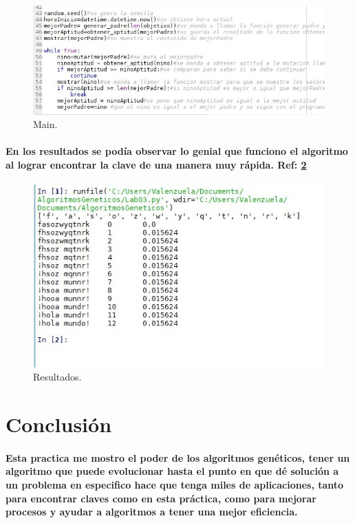 \documentclass[10pt,a4paper]{article}
\begin{document}
\begin{figure}[H]
\includegraphics[scale=0.7] {img5.jpg}
\caption{Main.}
\label{fig:cod5}
\end{figure}

\paragraph{
En los resultados se pod\'ia observar lo genial que funciono el algoritmo al lograr encontrar la clave de una manera muy r\'apida. Ref: \ref{fig:cod6}}

\begin{figure}[H]
\includegraphics[scale=0.7] {img6.jpg}
\caption{Resultados.}
\label{fig:cod6}
\end{figure}



\section{Conclusi\'on}
\paragraph{Esta practica me mostro el poder de los algoritmos gen\'eticos, tener un algoritmo que puede evolucionar hasta el punto en que d\'e soluci\'on a un problema en especifico hace que tenga miles de aplicaciones, tanto para encontrar claves como en esta pr\'actica, como para mejorar procesos y ayudar a algoritmos a tener una mejor eficiencia.}
\end{document}
